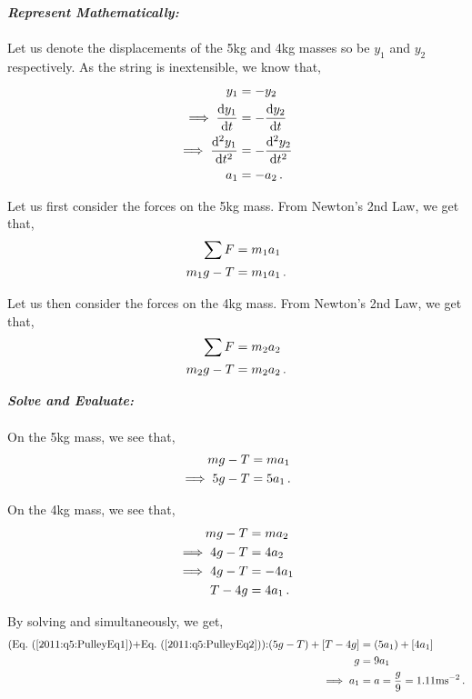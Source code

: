 \begin{subquestions}
\begin{subsubquestions}
	
	
	\textbf{\textit{Represent Mathematically:}} \\ \\ 
	Let us denote the displacements of the 5kg and 4kg masses so be $y_1$ and $y_2$ respectively. As the string is inextensible, we know that,
	\begin{align}
		y_1 & = -y_2 \nonumber \\
		\implies \frac{\mathrm{d}y_1}{\mathrm{d}t} & = -\frac{\mathrm{d}y_2}{\mathrm{d}t} \nonumber \\
		\implies \frac{\mathrm{d}^2y_1}{\mathrm{d}t^2} & = -\frac{\mathrm{d}^2y_2}{\mathrm{d}t^2} \nonumber \\
		a_1 & = -a_2 \,.
	\end{align}
	
	Let us first consider the forces on the 5kg mass. From Newton's 2nd Law, we get that,
	\begin{align}
		\sum F & = m_1a_1 \nonumber \\
		m_1g - T & = m_1a_1 \,.
	\end{align}
	
	Let us then consider the forces on the 4kg mass. From Newton's 2nd Law, we get that,
	\begin{align}
		\sum F & = m_2a_2 \nonumber \\
		m_2g-T & = m_2a_2 \,.
	\end{align}
	
	
	
	
	\textbf{\textit{Solve and Evaluate:}} \\ \\
	On the 5kg mass, we see that,
	\begin{align}
		mg - T & = ma_1 \nonumber \\
		\implies 5g-T & = 5a_1 \,. \label{2011:q5:PulleyEq1}
	\end{align}
	
	On the 4kg mass, we see that,
	\begin{align}
		mg - T & = ma_2 \nonumber \\
		\implies 4g-T & = 4a_2 \nonumber \\
		\implies 4g-T & = -4a_1 \nonumber \\
		T-4g & = 4a_1 \,. \label{2011:q5:PulleyEq2}
	\end{align}
	
	By solving  and  simultaneously, we get,
	\begin{align}
		\text{(\req{2011:q5:PulleyEq1}+\req{2011:q5:PulleyEq2}):} (5g-T)+[T-4g] & = (5a_1)+[4a_1] \nn \\
		g & = 9a_1 \nn \\
		\implies a_1 & = a = \frac{g}{9} = 1.11\text{ms}^{-2} \,.
	\end{align}
	

\end{subsubquestions}
\end{subquestions}
